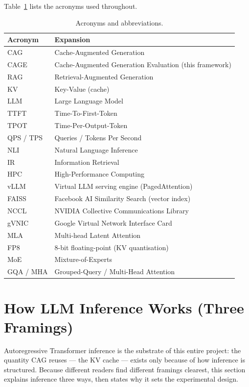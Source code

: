 \documentclass[12pt,a4paper]{article}
\begin{document}
Table~\ref{tab:acronyms} lists the acronyms used throughout.

\begin{table}[H]
\centering
\caption{Acronyms and abbreviations.}
\label{tab:acronyms}
\footnotesize
\begin{tabular}{@{}ll@{}}
\toprule
\textbf{Acronym} & \textbf{Expansion} \\
\midrule
CAG & Cache-Augmented Generation \\
CAGE & Cache-Augmented Generation Evaluation (this framework) \\
RAG & Retrieval-Augmented Generation \\
KV & Key-Value (cache) \\
LLM & Large Language Model \\
TTFT & Time-To-First-Token \\
TPOT & Time-Per-Output-Token \\
QPS / TPS & Queries / Tokens Per Second \\
NLI & Natural Language Inference \\
IR & Information Retrieval \\
HPC & High-Performance Computing \\
vLLM & Virtual LLM serving engine (PagedAttention) \\
FAISS & Facebook AI Similarity Search (vector index) \\
NCCL & NVIDIA Collective Communications Library \\
gVNIC & Google Virtual Network Interface Card \\
MLA & Multi-head Latent Attention \\
FP8 & 8-bit floating-point (KV quantisation) \\
MoE & Mixture-of-Experts \\
GQA / MHA & Grouped-Query / Multi-Head Attention \\
\bottomrule
\end{tabular}
\end{table}

\section{How LLM Inference Works (Three Framings)}
\label{sec:inference}

Autoregressive Transformer inference is the substrate of this entire project: the
quantity CAG reuses --- the KV cache --- exists only because of how inference is
structured. Because different readers find different framings clearest, this
section explains inference three ways, then states why it sets the experimental
design.
\end{document}
